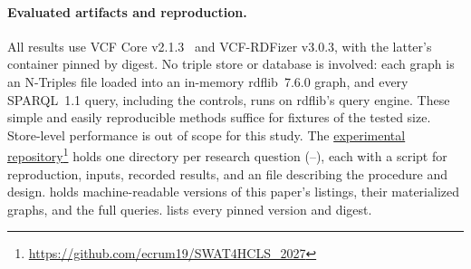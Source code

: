 \paragraph{Evaluated artifacts and reproduction.}
\label{sec:reproduction}
All results use VCF Core v2.1.3~\cite{vcfc210} and VCF-RDFizer v3.0.3, with the latter's container pinned by digest.
No triple store or database is involved: each graph is an N-Triples file loaded into an in-memory rdflib~7.6.0 graph, and every SPARQL~1.1 query, including the controls, runs on rdflib's query engine.
These simple and easily reproducible methods suffice for fixtures of the tested size.
Store-level performance is out of scope for this study.
The \href{https://github.com/ecrum19/SWAT4HCLS_2027}{experimental repository}\footnote{\url{https://github.com/ecrum19/SWAT4HCLS_2027}} holds one directory per research question (--), each with a script for reproduction, inputs, recorded results, and an  file describing the procedure and design.
\href{https://github.com/ecrum19/SWAT4HCLS_2027/tree/main/long_revised/examples}{} holds machine-readable versions of this paper's listings, their materialized graphs, and the full queries. 
\href{https://github.com/ecrum19/SWAT4HCLS_2027/blob/main/PINS.md}{} lists every pinned version and digest.
